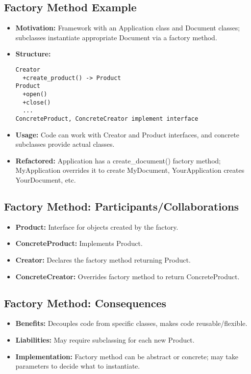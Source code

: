 \documentclass[11pt,a4paper]{article}
\begin{document}
\subsection*{Factory Method Example}
\begin{itemize}
    \item \textbf{Motivation:} Framework with an Application class and Document classes; subclasses instantiate appropriate Document via a factory method.
    \item \textbf{Structure:}
        \begin{verbatim}
Creator
  +create_product() -> Product
Product
  +open()
  +close()
  ...
ConcreteProduct, ConcreteCreator implement interface
        \end{verbatim}
    \item \textbf{Usage:} Code can work with Creator and Product interfaces, and concrete subclasses provide actual classes.
    \item \textbf{Refactored:} Application has a create_document() factory method; MyApplication overrides it to create MyDocument, YourApplication creates YourDocument, etc.
\end{itemize}

\subsection*{Factory Method: Participants/Collaborations}
\begin{itemize}
    \item \textbf{Product:} Interface for objects created by the factory.
    \item \textbf{ConcreteProduct:} Implements Product.
    \item \textbf{Creator:} Declares the factory method returning Product.
    \item \textbf{ConcreteCreator:} Overrides factory method to return ConcreteProduct.
\end{itemize}

\subsection*{Factory Method: Consequences}
\begin{itemize}
    \item \textbf{Benefits:} Decouples code from specific classes, makes code reusable/flexible.
    \item \textbf{Liabilities:} May require subclassing for each new Product.
    \item \textbf{Implementation:} Factory method can be abstract or concrete; may take parameters to decide what to instantiate.
\end{itemize}
\end{document}
